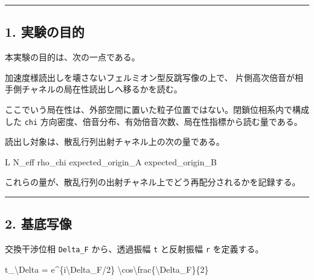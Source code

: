 \documentclass[
  xelatex,
  ja=standard]{bxjsarticle}
\newenvironment{Shaded}{}{}
\newcommand{\NormalTok}[1]{#1}
\begin{document}
\begin{center}\rule{0.5\linewidth}{0.5pt}\end{center}

\subsection{1. 実験の目的}\label{ux5b9fux9a13ux306eux76eeux7684}

本実験の目的は、次の一点である。

\begin{Shaded}
\begin{Highlighting}[]
\NormalTok{加速度様読出しを壊さないフェルミオン型反跳写像の上で、}
\NormalTok{片側高次倍音が相手側チャネルの局在性読出しへ移るかを読む。}
\end{Highlighting}
\end{Shaded}

ここでいう局在性は、外部空間に置いた粒子位置ではない。閉鎖位相系内で構成した
\texttt{chi}
方向密度、倍音分布、有効倍音次数、局在性指標から読む量である。

読出し対象は、散乱行列出射チャネル上の次の量である。

\begin{Shaded}
\begin{Highlighting}[]
\NormalTok{L}
\NormalTok{N\_eff}
\NormalTok{rho\_chi}
\NormalTok{expected\_origin\_A}
\NormalTok{expected\_origin\_B}
\end{Highlighting}
\end{Shaded}

これらの量が、散乱行列の出射チャネル上でどう再配分されるかを記録する。

\begin{center}\rule{0.5\linewidth}{0.5pt}\end{center}

\subsection{2. 基底写像}\label{ux57faux5e95ux5199ux50cf}

交換干渉位相 \texttt{Delta\_F} から、透過振幅 \texttt{t} と反射振幅
\texttt{r} を定義する。

\begin{Shaded}
\begin{Highlighting}[]
\NormalTok{t\_\textbackslash{}Delta}
\NormalTok{=}
\NormalTok{e\^{}\{i\textbackslash{}Delta\_F/2\}}
\NormalTok{\textbackslash{}cos\textbackslash{}frac\{\textbackslash{}Delta\_F\}\{2\}}
\end{Highlighting}
\end{Shaded}
\end{document}
